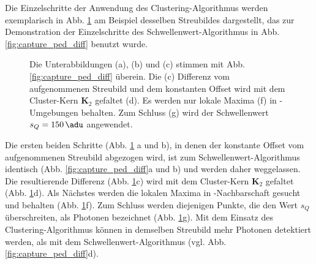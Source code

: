\noindent
Die Einzelschritte der Anwendung des Clustering-Algorithmus werden exemplarisch in Abb. \ref{fig:capture_ped_diff_clustering} am Beispiel desselben Streubildes dargestellt, das zur Demonstration der Einzelschritte des Schwellen\-wert-Algorithmus in Abb. \ref{fig:capture_ped_diff} benutzt wurde.
\begin{figure}[H]
    \centering
    
    \caption{Die Unterabbildungen (a), (b) und (c) stimmen mit Abb. \ref{fig:capture_ped_diff} überein. Die  (c) Differenz vom aufgenommenen Streubild und dem konstanten Offset wird mit dem Cluster-Kern $\mathbf{K}_2$ gefaltet (d). Es werden nur lokale Maxima (f) in -Umgebungen behalten. Zum Schluss (g) wird der Schwellenwert $s_Q = \SI{150}{\adu}$ angewendet.}
    \label{fig:capture_ped_diff_clustering}
\end{figure}
\noindent
Die ersten beiden Schritte (Abb. \ref{fig:capture_ped_diff_clustering} a und b), in denen der konstante Offset vom aufgenommenen Streubild abgezogen wird, ist zum Schwellenwert-Algorithmus identisch (Abb. \ref{fig:capture_ped_diff}a und b) und werden daher weggelassen. Die resultierende Differenz (Abb. \ref{fig:capture_ped_diff_clustering}c) wird mit dem Cluster-Kern  $\mathbf{K}_2$ gefaltet (Abb. \ref{fig:capture_ped_diff_clustering}d). Als Nächstes werden die lokalen Maxima in -Nachbarschaft gesucht und behalten (Abb. \ref{fig:capture_ped_diff_clustering}f). Zum Schluss werden diejenigen Punkte, die den Wert $s_Q$ überschreiten, als Photonen bezeichnet (Abb. \ref{fig:capture_ped_diff_clustering}g). Mit dem Einsatz des Clustering-Algorithmus können in demselben Streubild mehr Photonen detektiert werden, als mit dem Schwellenwert-Algorithmus (vgl. Abb. \ref{fig:capture_ped_diff}d).


